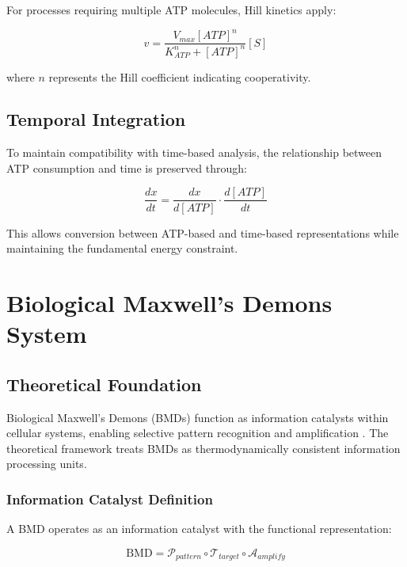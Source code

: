 \documentclass[12pt,a4paper]{article}
\begin{document}
For processes requiring multiple ATP molecules, Hill kinetics apply:

\begin{equation}
v = \frac{V_{max}[ATP]^n}{K_{ATP}^n + [ATP]^n}[S]
\end{equation}

where $n$ represents the Hill coefficient indicating cooperativity.

\subsection{Temporal Integration}

To maintain compatibility with time-based analysis, the relationship between ATP consumption and time is preserved through:

\begin{equation}
\frac{dx}{dt} = \frac{dx}{d[ATP]} \cdot \frac{d[ATP]}{dt}
\end{equation}

This allows conversion between ATP-based and time-based representations while maintaining the fundamental energy constraint.

\section{Biological Maxwell's Demons System}

\subsection{Theoretical Foundation}

Biological Maxwell's Demons (BMDs) function as information catalysts within cellular systems, enabling selective pattern recognition and amplification \cite{mizraji2021}. The theoretical framework treats BMDs as thermodynamically consistent information processing units.

\subsubsection{Information Catalyst Definition}

A BMD operates as an information catalyst with the functional representation:

\begin{equation}
\text{BMD} = \mathcal{P}_{pattern} \circ \mathcal{T}_{target} \circ \mathcal{A}_{amplify}
\end{equation}
\end{document}
